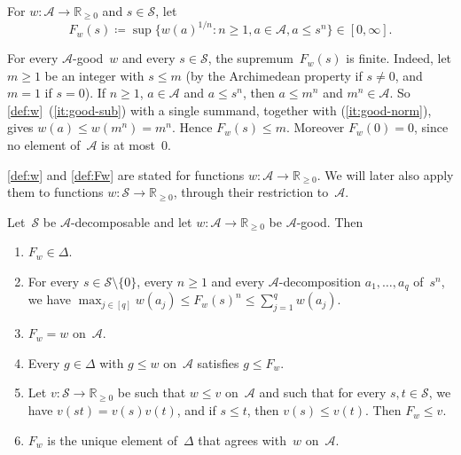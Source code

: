 \documentclass[11pt,letterpaper]{article}
\newcommand{\RR}{\mathbb{R}}
\begin{document}
\begin{definition}\label{def:Fw}
For $w : \mathcal{A} \to \RR_{\geq0}$ and $s \in \mathcal{S}$, let
\[
F_w(s) \coloneqq \sup \{ w(a)^{1/n} : n \geq 1, a \in \mathcal{A}, a \leq s^n \} \in [0, \infty].
\]
\end{definition}

For every $\mathcal{A}$-good~$w$ and every $s \in \mathcal{S}$, the supremum~$F_w(s)$ is finite. Indeed, let $m \geq 1$ be an integer with $s \leq m$ (by the Archimedean property if $s \neq 0$, and $m = 1$ if $s = 0$). If $n \geq 1$, $a \in \mathcal{A}$ and $a \leq s^n$, then $a \leq m^n$ and $m^n \in \mathcal{A}$. So \cref{def:w}~(\ref{it:good-sub}) with a single summand, together with (\ref{it:good-norm}), gives $w(a) \leq w(m^n) = m^n$. Hence $F_w(s) \leq m$. Moreover $F_w(0) = 0$, since no element of~$\mathcal{A}$ is at most~$0$.

\cref{def:w} and \cref{def:Fw} are stated for functions $w : \mathcal{A} \to \RR_{\geq0}$. We will later also apply them to functions $w : \mathcal{S} \to \RR_{\geq0}$, through their restriction to~$\mathcal{A}$. 

\begin{theorem}\label{th:w-good-spec}
Let~$\mathcal{S}$ be $\mathcal{A}$-decomposable and let $w : \mathcal{A} \to \RR_{\geq0}$ be $\mathcal{A}$-good. Then
\begin{enumerate}[\upshape(i)]
\item\label{it:Fw-spectral} $F_w \in \Delta$.
\item\label{it:Fw-limit} For every $s \in \mathcal{S} \setminus \{0\}$, every $n \geq 1$ and every $\mathcal{A}$-decomposition $a_1, \ldots, a_q$ of~$s^n$, we have $\max_{j \in [q]} w(a_j) \leq F_w(s)^n \leq \sum_{j=1}^q w(a_j)$.
\item\label{it:Fw-family} $F_w = w$ on~$\mathcal{A}$.
\item\label{it:Fw-largest} Every $g \in \Delta$ with $g \leq w$ on~$\mathcal{A}$ satisfies $g \leq F_w$.
\item\label{it:Fw-below} Let $v : \mathcal{S} \to \RR_{\geq0}$ be such that $w \leq v$ on~$\mathcal{A}$ and such that for every $s, t \in \mathcal{S}$, we have $v(st) = v(s)v(t)$, and if $s \leq t$, then $v(s) \leq v(t)$. Then $F_w \leq v$.
\item\label{it:Fw-unique} $F_w$ is the unique element of~$\Delta$ that agrees with~$w$ on~$\mathcal{A}$.
\end{enumerate}
\end{theorem}
\end{document}
